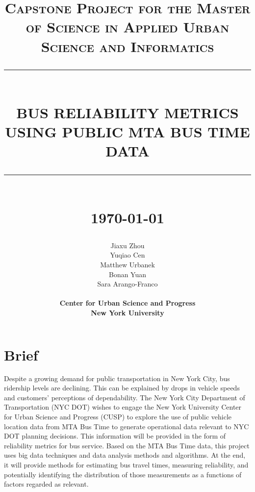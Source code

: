 \documentclass[12pt]{report}
\newcommand{\HRule}[1]{\rule{\linewidth}{#1}}
\begin{document}
\title{ \normalsize \textsc{Capstone Project for the Master of Science in Applied Urban Science and Informatics}
		\\ [2.0cm]
		\HRule{0.5pt} \\
		\LARGE \textbf{\uppercase{Bus Reliability Metrics using Public MTA Bus Time Data}}
		\HRule{2pt} \\ [0.5cm]
		\normalsize \today \vspace*{5\baselineskip}}

\date{}

\author{
		Jiaxu Zhou \\
		Yuqiao Cen \\
		Matthew Urbanek \\
		Bonan Yuan \\
		Sara Arango-Franco \\ 
		\\
		\textbf{Center for Urban Science and Progress} \\
		\textbf{New York University}}

\maketitle
\tableofcontents
\newpage

\sectionfont{\scshape}


\section*{Brief}

        Despite a growing demand for public transportation in New York City, bus ridership levels are declining. This can be explained by drops in vehicle speeds and customers' perceptions of dependability. The New York City Department of Transportation (NYC DOT) wishes to engage the New York University Center for Urban Science and Progress (CUSP) to explore the use of public vehicle location data from MTA Bus Time to generate operational data relevant to NYC DOT planning decisions. This information will be provided in the form of reliability metrics for bus service.
        Based on the MTA Bus Time data, this project uses big data techniques and data analysis methods and algorithms. At the end, it will provide methods for estimating bus travel times, measuring reliability, and potentially identifying the distribution of those measurements as a functions of factors regarded as relevant.
        
\end{document}
